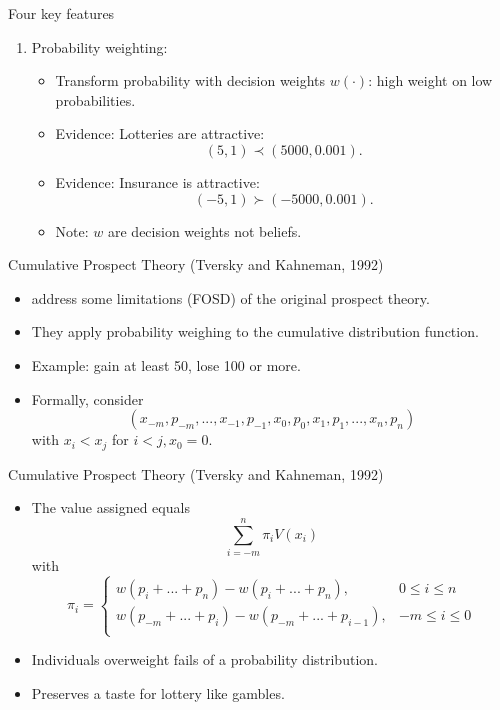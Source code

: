 \begin{frame}{Four key features}
    \begin{enumerate}[4.]
        \item Probability weighting:\medskip
            \begin{itemize}
                \item Transform probability with decision weights $w(\cdot)$:
                high weight on low probabilities.\medskip
                \item Evidence: Lotteries are attractive: \[(5,1)\prec (5000,0.001).\]
                \item Evidence: Insurance is attractive: \[(-5,1)\succ (-5000,0.001).\]
            \item Note: $w$ are decision weights not beliefs.
        \end{itemize}
    \end{enumerate}
\end{frame}



\begin{frame}{Cumulative Prospect Theory (Tversky and Kahneman, 1992)}
    \begin{itemize}
        \item \citet{TverskyKahneman1992} address some limitations (FOSD) of the original \citet{KahnemanTversky1979} prospect theory.\bigskip
        \item They apply probability weighing to the cumulative distribution function.\bigskip
        \item Example: gain at least 50, lose 100 or more.\bigskip
        \item Formally, consider
        \[(x_{-m},p_{-m},...,x_{-1},p_{-1},x_0,p_0,x_1,p_1,...,x_n,p_n)\]
        with $x_i < x_j$ for $i<j,x_0=0$.\bigskip
         \end{itemize}
\end{frame}

\begin{frame}{Cumulative Prospect Theory (Tversky and Kahneman, 1992)}
    \begin{itemize}
       \item The value assigned equals
        \[ \sum_{i=-m}^{n} \pi_i V(x_i)\]
        with
            \begin{equation}
                \pi_i = \begin{cases}
                w(p_i+...+p_n) - w(p_i+...+p_n),  & 0\leq i \leq  n\\
                w(p_{-m}+...+p_i) - w(p_{-m}+...+p_{i-1}),  & -m\leq i \leq 0\\
            \end{cases}
            \end{equation}\medskip
        \item Individuals overweight fails of a probability distribution.\medskip
        \item Preserves a taste for lottery like gambles.\medskip
    \end{itemize}
\end{frame}

